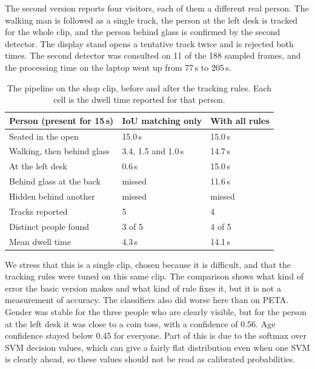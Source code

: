 \documentclass[conference]{IEEEtran}
\begin{document}
The second version reports four visitors, each of them a different real person.
The walking man is followed as a single track, the person at the left desk is
tracked for the whole clip, and the person behind glass is confirmed by the second
detector. The display stand opens a tentative track twice and is rejected both
times. The second detector was consulted on 11 of the 188 sampled frames, and the
processing time on the laptop went up from 77\,s to 205\,s.

\begin{table}[t]
\caption{The pipeline on the shop clip, before and after the tracking rules.
Each cell is the dwell time reported for that person.}
\label{tab:field}
\centering
\begin{tabular}{@{}lll@{}}
\toprule
Person (present for 15\,s) & IoU matching only & With all rules \\
\midrule
Seated in the open  & 15.0\,s & 15.0\,s \\
Walking, then behind glass & 3.4, 1.5 and 1.0\,s & 14.7\,s \\
At the left desk    & 0.6\,s & 15.0\,s \\
Behind glass at the back & missed & 11.6\,s \\
Hidden behind another & missed & missed \\
\midrule
Tracks reported     & 5 & 4 \\
Distinct people found & 3 of 5 & 4 of 5 \\
Mean dwell time     & 4.3\,s & 14.1\,s \\
\bottomrule
\end{tabular}
\end{table}

We stress that this is a single clip, chosen because it is difficult, and that the
tracking rules were tuned on this same clip. The comparison shows what kind of
error the basic version makes and what kind of rule fixes it, but it is not a
measurement of accuracy. The classifiers also did worse here than on PETA. Gender
was stable for the three people who are clearly visible, but for the person at the
left desk it was close to a coin toss, with a confidence of 0.56. Age confidence
stayed below 0.45 for everyone. Part of this is due to the softmax over SVM
decision values, which can give a fairly flat distribution even when one SVM is
clearly ahead, so these values should not be read as calibrated probabilities.




\end{document}
